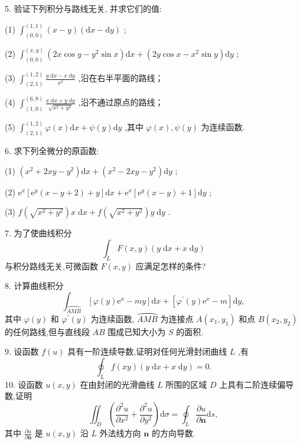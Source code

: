 5. 验证下列积分与路线无关, 并求它们的值:

(1) \({\int }_{\left( 0,0\right) }^{\left( 1,1\right) }\left( {x - y}\right) \left( {\mathrm{d}x - \mathrm{d}y}\right)\) ;

(2) \({\int }_{\left( 0,0\right) }^{\left( x,y\right) }\left( {{2x}\cos y - {y}^{2}\sin x}\right) \mathrm{d}x + \left( {{2y}\cos x - {x}^{2}\sin y}\right) \mathrm{d}y\) ;

(3) \({\int }_{\left( 2,1\right) }^{\left( 1,2\right) }\frac{y\mathrm{\;d}x - x\mathrm{\;d}y}{{x}^{2}}\) ,沿在右半平面的路线；

(4) \({\int }_{\left( 1,0\right) }^{\left( 6,8\right) }\frac{x\mathrm{\;d}x + y\mathrm{\;d}y}{\sqrt{{x}^{2} + {y}^{2}}}\) ,沿不通过原点的路线；

(5) \({\int }_{\left( 2,1\right) }^{\left( 1,2\right) }\varphi \left( x\right) \mathrm{d}x + \psi \left( y\right) \mathrm{d}y\) ,其中 \(\varphi \left( x\right) ,\psi \left( y\right)\) 为连续函数.

6. 求下列全微分的原函数:

(1) \(\left( {{x}^{2} + {2xy} - {y}^{2}}\right) \mathrm{d}x + \left( {{x}^{2} - {2xy} - {y}^{2}}\right) \mathrm{d}y\) ;

(2) \({\mathrm{e}}^{x}\left\lbrack  {{\mathrm{e}}^{y}\left( {x - y + 2}\right)  + y}\right\rbrack  \mathrm{d}x + {\mathrm{e}}^{x}\left\lbrack  {{\mathrm{e}}^{y}\left( {x - y}\right)  + 1}\right\rbrack  \mathrm{d}y\) ;

(3) \(f\left( \sqrt{{x}^{2} + {y}^{2}}\right) x\mathrm{\;d}x + f\left( \sqrt{{x}^{2} + {y}^{2}}\right) y\mathrm{\;d}y\) .

7. 为了使曲线积分
\[
{\int }_{L}F\left( {x,y}\right) \left( {y\mathrm{\;d}x + x\mathrm{\;d}y}\right)
\]
与积分路线无关,可微函数 \(F\left( {x,y}\right)\) 应满足怎样的条件?

8. 计算曲线积分
\[
{\int }_{\overset{⏜}{AMB}}\left\lbrack  {\varphi \left( y\right) {\mathrm{e}}^{x} - {my}}\right\rbrack  \mathrm{d}x + \left\lbrack  {{\varphi }^{\prime }\left( y\right) {\mathrm{e}}^{x} - m}\right\rbrack  \mathrm{d}y,
\]
其中 \(\varphi \left( y\right)\) 和 \({\varphi }^{\prime }\left( y\right)\) 为连续函数, \(\overset{⏜}{AMB}\) 为连接点 \(A\left( {{x}_{1},{y}_{1}}\right)\) 和点 \(B\left( {{x}_{2},{y}_{2}}\right)\) 的任何路线,但与直线段 \({AB}\) 围成已知大小为 \(S\) 的面积.

9. 设函数 \(f\left( u\right)\) 具有一阶连续导数,证明对任何光滑封闭曲线 \(L\) ,有
\[
{\oint }_{L}f\left( {xy}\right) \left( {y\mathrm{\;d}x + x\mathrm{\;d}y}\right)  = 0.
\]
10. 设函数 \(u\left( {x,y}\right)\) 在由封闭的光滑曲线 \(L\) 所围的区域 \(D\) 上具有二阶连续偏导数,证明
\[
{\iint }_{D}\left( {\frac{{\partial }^{2}u}{\partial {x}^{2}} + \frac{{\partial }^{2}u}{\partial {y}^{2}}}\right) \mathrm{d}\sigma  = {\oint }_{L}\frac{\partial u}{\partial \mathbf{n}}\mathrm{d}s,
\]
其中 \(\frac{\partial u}{\partial \mathbf{n}}\) 是 \(u\left( {x,y}\right)\) 沿 \(L\) 外法线方向 \(\mathbf{n}\) 的方向导数.

